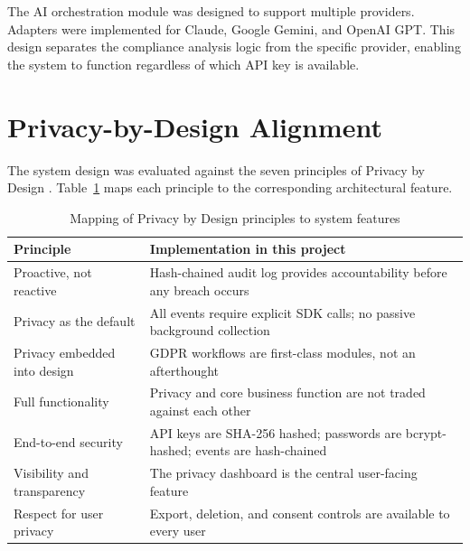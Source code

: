 \documentclass[a4paper,12pt,onecolumn]{report}
\begin{document}
The AI orchestration module was designed to support multiple providers.
Adapters were implemented for Claude, Google Gemini, and OpenAI GPT.
This design separates the compliance analysis logic from the specific provider, enabling the system to function regardless of which API key is available.

\section{Privacy-by-Design Alignment}

The system design was evaluated against the seven principles of Privacy by Design \cite{cavoukian2009}.
Table~\ref{tab:privacy-design} maps each principle to the corresponding architectural feature.

\begin{table}[h]
    \begin{center}
        \begin{tabular}{|l|p{8cm}|}
            \hline
            \textbf{Principle} & \textbf{Implementation in this project} \\
            \hline
            Proactive, not reactive & Hash-chained audit log provides accountability before any breach occurs \\
            \hline
            Privacy as the default & All events require explicit SDK calls; no passive background collection \\
            \hline
            Privacy embedded into design & GDPR workflows are first-class modules, not an afterthought \\
            \hline
            Full functionality & Privacy and core business function are not traded against each other \\
            \hline
            End-to-end security & API keys are SHA-256 hashed; passwords are bcrypt-hashed; events are hash-chained \\
            \hline
            Visibility and transparency & The privacy dashboard is the central user-facing feature \\
            \hline
            Respect for user privacy & Export, deletion, and consent controls are available to every user \\
            \hline
        \end{tabular}
    \end{center}
    \caption{Mapping of Privacy by Design principles to system features \cite{cavoukian2009}}
    \label{tab:privacy-design}
\end{table}
\end{document}
